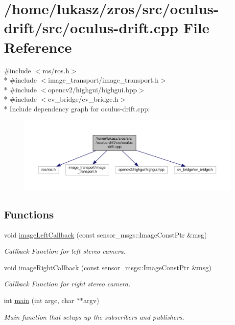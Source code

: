 \hypertarget{oculus-drift_8cpp}{}\section{/home/lukasz/zros/src/oculus-\/drift/src/oculus-\/drift.cpp File Reference}
\label{oculus-drift_8cpp}
{\ttfamily \#include $<$ros/ros.\+h$>$}\\*
{\ttfamily \#include $<$image\+\_\+transport/image\+\_\+transport.\+h$>$}\\*
{\ttfamily \#include $<$opencv2/highgui/highgui.\+hpp$>$}\\*
{\ttfamily \#include $<$cv\+\_\+bridge/cv\+\_\+bridge.\+h$>$}\\*
Include dependency graph for oculus-\/drift.cpp\+:\nopagebreak
\begin{figure}[H]
\begin{center}
\leavevmode
\includegraphics[width=350pt]{oculus-drift_8cpp__incl}
\end{center}
\end{figure}
\subsection*{Functions}
\begin{DoxyCompactItemize}
\item 
void \hyperlink{oculus-drift_8cpp_accfc2045f699b2d8782deca8e1d971cf}{image\+Left\+Callback} (const sensor\+\_\+msgs\+::\+Image\+Const\+Ptr \&msg)
\begin{DoxyCompactList}\small\item\em Callback Function for left stereo camera. \end{DoxyCompactList}\item 
void \hyperlink{oculus-drift_8cpp_a2bee7d800dfae62103d7aaa2e0961787}{image\+Right\+Callback} (const sensor\+\_\+msgs\+::\+Image\+Const\+Ptr \&msg)
\begin{DoxyCompactList}\small\item\em Callback Function for right stereo camera. \end{DoxyCompactList}\item 
int \hyperlink{oculus-drift_8cpp_a3c04138a5bfe5d72780bb7e82a18e627}{main} (int argc, char $\ast$$\ast$argv)
\begin{DoxyCompactList}\small\item\em Main function that setups up the subscribers and publishers. \end{DoxyCompactList}\end{DoxyCompactItemize}
